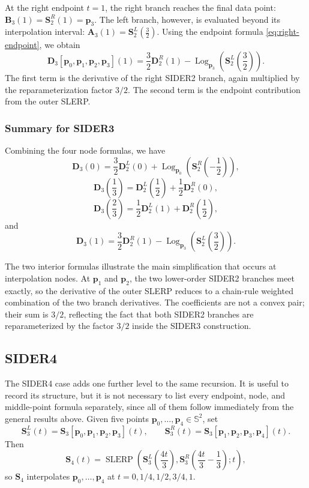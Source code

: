 \documentclass[a4paper,11pt]{article}
\newcommand{\bp}{\mathbf{p}}
\newcommand{\bA}{\mathbf{A}}
\newcommand{\bB}{\mathbf{B}}
\newcommand{\bD}{\mathbf{D}}
\newcommand{\Log}{\operatorname{Log}}
\numberwithin{equation}{section}
\theoremstyle{plain}
\theoremstyle{definition}
\theoremstyle{remark}
\newcommand{\Sph}{\mathbb{S}^2}
\newcommand{\slerp}{\operatorname{SLERP}}
\begin{document}
At the right endpoint $t=1$, the right branch reaches the final data point:
\(\bB_3(1) = \mathbf{S}_2^R(1) = \bp_3.\)
The left branch, however, is evaluated beyond its interpolation interval:
\(\bA_3(1) = \mathbf{S}_2^L\!\left(\frac32\right).\)
Using the endpoint formula \eqref{eq:right-endpoint}, we obtain
\[
\boxed{
        \bD_3[\bp_0,\bp_1,\bp_2,\bp_3](1)
        =
        \frac32\bD_2^R(1)
        -
        \Log_{\bp_3}\!\left(
        \mathbf{S}_2^L\!\left(\frac32\right)
        \right).
}
\]
The first term is the derivative of the right SIDER2 branch, again multiplied by the reparameterization factor $3/2$.  The second term is the endpoint contribution from the outer SLERP.

\subsubsection{Summary for SIDER3}

Combining the four node formulas, we have
\[
\boxed{
        \bD_3(0)
        =
        \frac32\bD_2^L(0)
        +
        \Log_{\bp_0}\!\left(\mathbf{S}_2^R\!\left(-\frac12\right)\right),
}
\]
\[
\boxed{
        \bD_3\!\left(\frac13\right)
        =
        \bD_2^L\!\left(\frac12\right)
        +
        \frac12\bD_2^R(0),
}
\]
\[
\boxed{
        \bD_3\!\left(\frac23\right)
        =
        \frac12\bD_2^L(1)
        +
        \bD_2^R\!\left(\frac12\right),
}
\]
and
\[
\boxed{
        \bD_3(1)
        =
        \frac32\bD_2^R(1)
        -
        \Log_{\bp_3}\!\left(\mathbf{S}_2^L\!\left(\frac32\right)\right).
}
\]

The two interior formulas illustrate the main simplification that occurs at interpolation nodes.  At $\bp_1$ and $\bp_2$, the two lower-order SIDER2 branches meet exactly, so the derivative of the outer SLERP reduces to a chain-rule weighted combination of the two branch derivatives.  The coefficients are not a convex pair; their sum is $3/2$, reflecting the fact that both SIDER2 branches are reparameterized by the factor $3/2$ inside the SIDER3 construction.

\subsection{SIDER4}

The SIDER4 case adds one further level to the same recursion.  It is useful to record its structure, but it is not necessary to list every endpoint, node, and middle-point formula separately, since all of them follow immediately from the general results above.  Given five points \(\bp_0,\ldots,\bp_4\in\Sph\), set
\[
        \mathbf{S}_3^L(t)=\mathbf{S}_3[\bp_0,\bp_1,\bp_2,\bp_3](t),
        \qquad
        \mathbf{S}_3^R(t)=\mathbf{S}_3[\bp_1,\bp_2,\bp_3,\bp_4](t).
\]
Then
\[
        \mathbf{S}_4(t)
        =
        \slerp\left(
        \mathbf{S}_3^L\!\left(\frac{4t}{3}\right),
        \mathbf{S}_3^R\!\left(\frac{4t}{3}-\frac13\right);
        t
        \right),
\]
so \(\mathbf{S}_4\) interpolates \(\bp_0,\ldots,\bp_4\) at \(t=0,1/4,1/2,3/4,1\).
\end{document}
